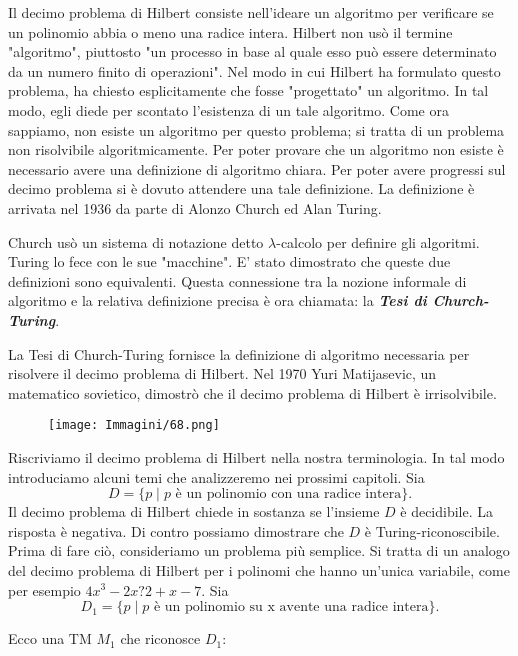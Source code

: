 \documentclass{article}
\begin{document}
Il decimo problema di Hilbert consiste nell'ideare un algoritmo per verificare se un polinomio abbia o meno una radice intera.
Hilbert non usò il termine "algoritmo", piuttosto "un processo in base al quale esso può essere determinato da un numero finito di operazioni".
Nel modo in cui Hilbert ha formulato questo problema, ha chiesto esplicitamente che fosse "progettato" un algoritmo. 
In tal modo, egli diede per scontato l'esistenza di un tale algoritmo.
Come ora sappiamo, non esiste un algoritmo per questo problema; si tratta di un problema non risolvibile algoritmicamente.
Per poter provare che un algoritmo non esiste è necessario avere una definizione di algoritmo chiara.
Per poter avere progressi sul decimo problema si è dovuto attendere una tale definizione.
La definizione è arrivata nel 1936 da parte di Alonzo Church ed Alan Turing.

Church usò un sistema di notazione detto $\lambda$-calcolo per definire gli algoritmi.
Turing lo fece con le sue "macchine".
E' stato dimostrato che queste due definizioni sono equivalenti.
Questa connessione tra la nozione informale di algoritmo e la relativa definizione precisa è ora chiamata: la \textbf{\textit{Tesi di Church-Turing}}.

La Tesi di Church-Turing fornisce la definizione di algoritmo necessaria per risolvere il decimo problema di Hilbert.
Nel 1970 Yuri Matijasevic, un matematico sovietico, dimostrò che il decimo problema di Hilbert è irrisolvibile.

\begin{figure}[H]
    \centering
    \texttt{[image: Immagini/68.png]}
    \label{fig:example_image}
\end{figure}

Riscriviamo il decimo problema di Hilbert nella nostra terminologia.
In tal modo introduciamo alcuni temi che analizzeremo nei prossimi capitoli. Sia
$$
D = \{p \mid p \text{ è un polinomio con una radice intera}\}.
$$
Il decimo problema di Hilbert chiede in sostanza se l'insieme $D$ è decidibile.
La risposta è negativa.
Di contro possiamo dimostrare che $D$ è Turing-riconoscibile.
Prima di fare ciò, consideriamo un problema più semplice.
Si tratta di un analogo del decimo problema di Hilbert per i polinomi che hanno un'unica variabile, come per esempio $4x^3 - 2x?2 + x - 7$.
Sia 
$$
D_1 = \{p \mid p \text{ è un polinomio su x avente una radice intera}\}.
$$

Ecco una TM $M_1$ che riconosce $D_1$:
\newline
\end{document}
